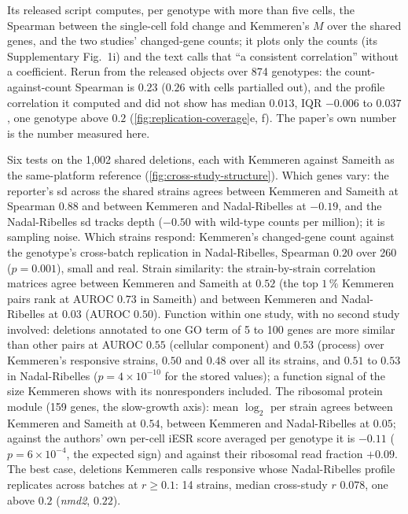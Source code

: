  Its released script
computes, per genotype with more than five cells, the Spearman between the single-cell
fold change and Kemmeren's $M$ over the shared genes, and the two studies' changed-gene
counts; it plots only the counts (its Supplementary Fig.\ 1i) and the text calls that
``a consistent correlation'' without a coefficient. Rerun from the released objects
over 874 genotypes: the count-against-count Spearman is $0.23$ ($0.26$ with cells
partialled out), and the profile correlation it computed and did not show has median
$0.013$, IQR $-0.006$ to $0.037$, one genotype above $0.2$
(\cref{fig:replication-coverage}e, f). The paper's own number is the number measured
here.

Six tests on the 1{,}002 shared deletions, each with Kemmeren against Sameith as the
same-platform reference (\cref{fig:cross-study-structure}). Which genes vary: the
reporter's sd across the shared strains agrees between Kemmeren and Sameith at Spearman
$0.88$ and between Kemmeren and Nadal-Ribelles at $-0.19$, and the Nadal-Ribelles sd
tracks depth ($-0.50$ with wild-type counts per million); it is sampling noise. Which
strains respond: Kemmeren's changed-gene count against the genotype's cross-batch
replication in Nadal-Ribelles, Spearman $0.20$ over 260 ($p = 0.001$), small and real.
Strain similarity: the strain-by-strain correlation matrices agree between Kemmeren and
Sameith at $0.52$ (the top $1\,\%$ Kemmeren pairs rank at AUROC $0.73$ in Sameith) and
between Kemmeren and Nadal-Ribelles at $0.03$ (AUROC $0.50$). Function within one study,
with no second study involved: deletions annotated to one GO term of 5 to 100 genes are
more similar than other pairs at AUROC $0.55$ (cellular component) and $0.53$ (process)
over Kemmeren's responsive strains, $0.50$ and $0.48$ over all its strains, and $0.51$
to $0.53$ in Nadal-Ribelles ($p = 4 \times 10^{-10}$ for the stored values); a function
signal of the size Kemmeren shows with its nonresponders included. The ribosomal protein
module (159 genes, the slow-growth axis): mean $\log_2$ per strain agrees between
Kemmeren and Sameith at $0.54$, between Kemmeren and Nadal-Ribelles at $0.05$; against
the authors' own per-cell iESR score averaged per genotype it is $-0.11$ ($p = 6 \times
10^{-4}$, the expected sign) and against their ribosomal read fraction $+0.09$. The best
case, deletions Kemmeren calls responsive whose Nadal-Ribelles profile replicates across
batches at $r \ge 0.1$: 14 strains, median cross-study $r$ $0.078$, one above $0.2$
(\textit{nmd2}, $0.22$).

